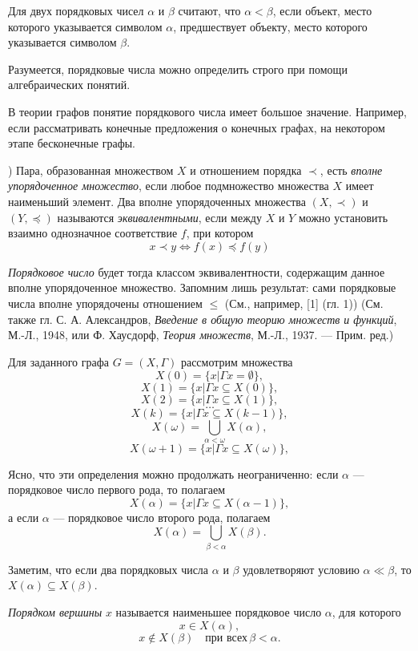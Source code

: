 Для двух порядковых чисел $\alpha$ и $\beta$ считают, что $\alpha < \beta$, если объект, место которого указывается символом $\alpha$, предшествует объекту, место которого указывается символом $\beta$.

Разумеется, порядковые числа можно определить строго при помощи алгебраических понятий.

В теории графов понятие порядкового числа имеет большое значение. Например, если рассматривать конечные предложения о конечных графах, на некотором этапе бесконечные графы.

) Пара, образованная множеством $X$ и отношением порядка $\prec$, есть \textit{вполне упорядоченное множество}, если любое подмножество множества $X$ имеет наименьший элемент. Два вполне упорядоченных множества $(X, \prec)$ и $(Y, \preceq)$ называются \textit{эквивалентными}, если между $X$ и $Y$ можно установить взаимно однозначное соответствие $f$, при котором
\[
x \prec y \iff f(x) \preceq f(y)
\]

\textit{Порядковое число} будет тогда классом эквивалентности, содержащим данное вполне упорядоченное множество. Запомним лишь результат: сами порядковые числа вполне упорядочены отношением $\leq$ (См., например, [1] (гл. 1)) (См. также гл. С. А. Александров, \textit{Введение в общую теорию множеств и функций}, М.-Л., 1948, или Ф. Хаусдорф, \textit{Теория множеств}, М.-Л., 1937. --- Прим. ред.)

Для заданного графа $G = (X, \Gamma)$ рассмотрим множества
\[
X(0) = \{x | \Gamma x = \emptyset\},
\]
\[
X(1) = \{x | \Gamma x \subseteq X(0)\},
\]
\[
X(2) = \{x | \Gamma x \subseteq X(1)\},
\]
\[
\ldots
\]
\[
X(k) = \{x | \Gamma x \subseteq X(k - 1)\},
\]
\[
X(\omega) = \bigcup_{\alpha < \omega} X(\alpha),
\]
\[
X(\omega + 1) = \{x | \Gamma x \subseteq X(\omega)\},
\]

\noindent
Ясно, что эти определения можно продолжать неограниченно: если $\alpha$ --- порядковое число первого рода, то полагаем
\[
X(\alpha) = \{x | \Gamma x \subseteq X(\alpha - 1)\},
\]
а если $\alpha$ --- порядковое число второго рода, полагаем
\[
X(\alpha) = \bigcup_{\beta < \alpha} X(\beta).
\]

Заметим, что если два порядковых числа $\alpha$ и $\beta$ удовлетворяют условию $\alpha \ll \beta$, то $X(\alpha) \subseteq X(\beta)$.

\textit{Порядком вершины} $x$ называется наименьшее порядковое число $\alpha$, для которого
\[
x \in X(\alpha),
\]
\[
x \notin X(\beta) \quad \text{при всех} \, \beta < \alpha.
\]

